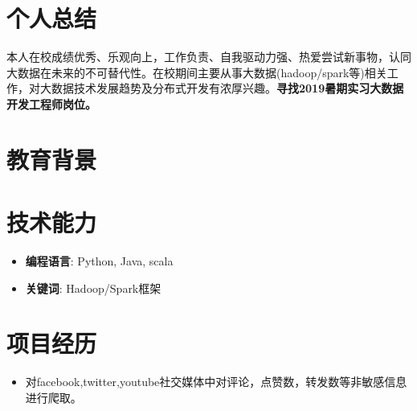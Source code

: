 \documentclass{resume}
\begin{document}



\section{个人总结}
本人在校成绩优秀、乐观向上，工作负责、自我驱动力强、热爱尝试新事物，认同大数据在未来的不可替代性。在校期间主要从事大数据(hadoop/spark等)相关工作，对大数据技术发展趋势及分布式开发有浓厚兴趣。\textbf{寻找2019暑期实习大数据开发工程师岗位。}

\section{教育背景}


\section{技术能力}
\begin{itemize}[parsep=0.2ex]
  \item \textbf{编程语言}: Python, Java, scala
  \item \textbf{关键词}: Hadoop/Spark框架
\end{itemize}


\section{项目经历}
\begin{itemize}
   \item 对facebook,twitter,youtube社交媒体中对评论，点赞数，转发数等非敏感信息进行爬取。
\end{itemize}
\end{document}
